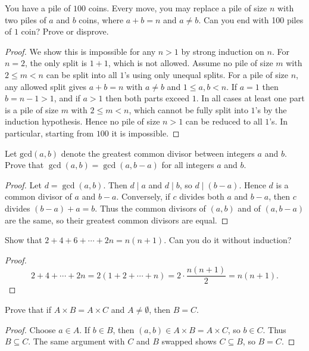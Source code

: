 \documentclass[12pt]{article}
\begin{document}
\begin{problem}
You have a pile of $100$ coins. Every move, you may replace a pile of size $n$ with two piles of $a$ and $b$ coins, where $a + b = n$ and $a \neq b$. Can you end with 100 piles of $1$ coin? Prove or disprove.
\begin{proof}
We show this is impossible for any $n>1$ by strong induction on $n$. For $n=2$, the only split is $1+1$, which is not allowed. Assume no pile of size $m$ with $2\le m<n$ can be split into all $1$'s using only unequal splits. For a pile of size $n$, any allowed split gives $a+b=n$ with $a\ne b$ and $1\le a,b<n$. If $a=1$ then $b=n-1>1$, and if $a>1$ then both parts exceed $1$. In all cases at least one part is a pile of size $m$ with $2\le m<n$, which cannot be fully split into $1$'s by the induction hypothesis. Hence no pile of size $n>1$ can be reduced to all $1$'s. In particular, starting from $100$ it is impossible.
\end{proof}
\end{problem}

\begin{problem}
Let $\text{gcd}(a,b)$ denote the greatest common divisor between integers $a$ and $b$. Prove that $\gcd(a,b) = \gcd(a,b-a)$ for all integers $a$ and $b$.
\begin{proof}
Let $d=\gcd(a,b)$. Then $d\mid a$ and $d\mid b$, so $d\mid (b-a)$. Hence $d$ is a common divisor of $a$ and $b-a$. Conversely, if $c$ divides both $a$ and $b-a$, then $c$ divides $(b-a)+a=b$. Thus the common divisors of $(a,b)$ and of $(a,b-a)$ are the same, so their greatest common divisors are equal.
\end{proof}
\end{problem}

\begin{problem}
Show that $2 + 4 + 6 + \cdots + 2n = n(n+1)$. Can you do it without induction?
\begin{proof}
\[
2+4+\cdots+2n=2(1+2+\cdots+n)=2\cdot\frac{n(n+1)}{2}=n(n+1).
\]
\end{proof}
\end{problem}

\begin{problem}
Prove that if $A \times B = A \times C$ and $A \neq \emptyset$, then $B = C$.
\begin{proof}
Choose $a\in A$. If $b\in B$, then $(a,b)\in A\times B=A\times C$, so $b\in C$. Thus $B\subseteq C$. The same argument with $C$ and $B$ swapped shows $C\subseteq B$, so $B=C$.
\end{proof}
\end{problem}
\end{document}
